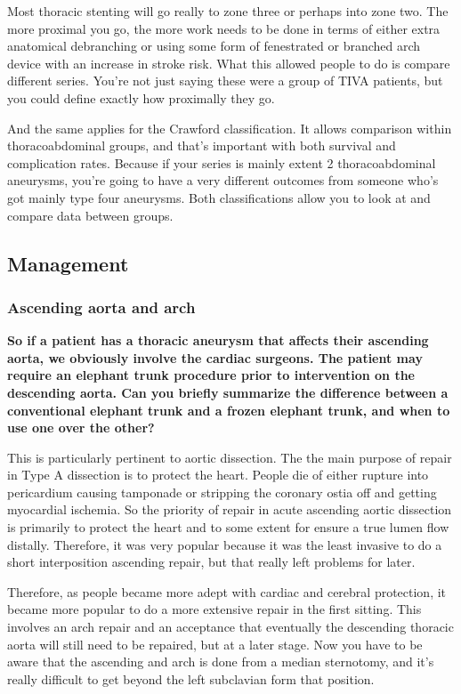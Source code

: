 \documentclass[
]{book}
\begin{document}
Most thoracic stenting will go really to zone three or perhaps into zone
two. The more proximal you go, the more work needs to be done in terms
of either extra anatomical debranching or using some form of fenestrated
or branched arch device with an increase in stroke risk. What this
allowed people to do is compare different series. You're not just saying
these were a group of TIVA patients, but you could define exactly how
proximally they go.

And the same applies for the Crawford classification. It allows
comparison within thoracoabdominal groups, and that's important with
both survival and complication rates. Because if your series is mainly
extent 2 thoracoabdominal aneurysms, you're going to have a very
different outcomes from someone who's got mainly type four aneurysms.
Both classifications allow you to look at and compare data between
groups.

\hypertarget{management-28}{%
\subsection{Management}\label{management-28}}

\hypertarget{ascending-aorta-and-arch}{%
\subsubsection{Ascending aorta and arch}\label{ascending-aorta-and-arch}}

\textbf{So if a patient has a thoracic aneurysm that affects their ascending
aorta, we obviously involve the cardiac surgeons. The patient may
require an elephant trunk procedure prior to intervention on the
descending aorta. Can you briefly summarize the difference between a
conventional elephant trunk and a frozen elephant trunk, and when to use
one over the other?}

This is particularly pertinent to aortic dissection. The the main
purpose of repair in Type A dissection is to protect the heart. People
die of either rupture into pericardium causing tamponade or stripping
the coronary ostia off and getting myocardial ischemia. So the priority
of repair in acute ascending aortic dissection is primarily to protect
the heart and to some extent for ensure a true lumen flow distally.
Therefore, it was very popular because it was the least invasive to do a
short interposition ascending repair, but that really left problems for
later.

Therefore, as people became more adept with cardiac and cerebral
protection, it became more popular to do a more extensive repair in the
first sitting. This involves an arch repair and an acceptance that
eventually the descending thoracic aorta will still need to be repaired,
but at a later stage. Now you have to be aware that the ascending and
arch is done from a median sternotomy, and it's really difficult to get
beyond the left subclavian form that position.
\end{document}
